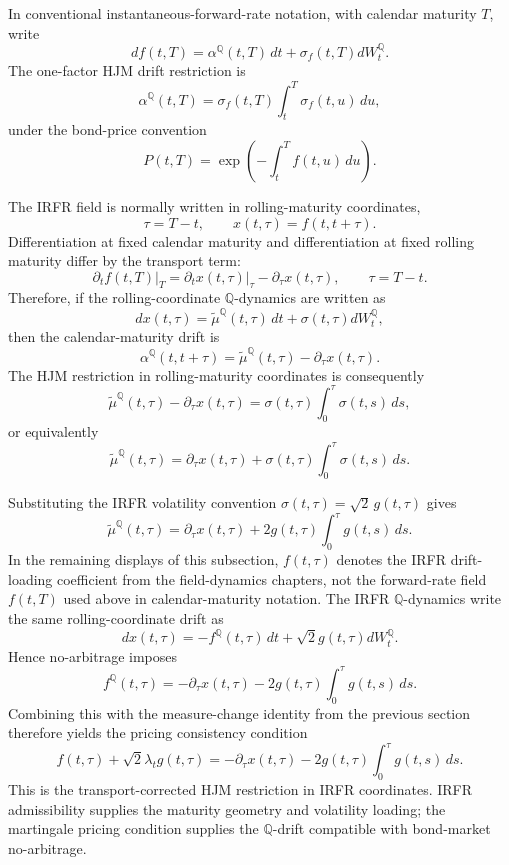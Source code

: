 \documentclass[11pt,oneside]{book}
\begin{document}
In conventional instantaneous-forward-rate notation, with calendar
maturity \(T\), write
\[
df(t,T)=\alpha^{\mathbb Q}(t,T)\,dt+
\sigma_f(t,T)dW_t^{\mathbb Q}.
\]
The one-factor HJM drift restriction is
\[
\alpha^{\mathbb Q}(t,T)
=
\sigma_f(t,T)
\int_t^T \sigma_f(t,u)\,du,
\]
under the bond-price convention
\[
P(t,T)=\exp\left(-\int_t^T f(t,u)\,du\right).
\]

The IRFR field is normally written in rolling-maturity coordinates,
\[
\tau=T-t,
\qquad
x(t,\tau)=f(t,t+\tau).
\]
Differentiation at fixed calendar maturity and differentiation at fixed
rolling maturity differ by the transport term:
\[
\left.\partial_t f(t,T)\right|_T
=
\left.\partial_t x(t,\tau)\right|_\tau
-
\partial_\tau x(t,\tau),
\qquad \tau=T-t.
\]
Therefore, if the rolling-coordinate \(\mathbb Q\)-dynamics are written as
\[
dx(t,\tau)
=
\widetilde\mu^{\mathbb Q}(t,\tau)\,dt
+
\sigma(t,\tau)dW_t^{\mathbb Q},
\]
then the calendar-maturity drift is
\[
\alpha^{\mathbb Q}(t,t+\tau)
=
\widetilde\mu^{\mathbb Q}(t,\tau)-\partial_\tau x(t,\tau).
\]
The HJM restriction in rolling-maturity coordinates is consequently
\[
\widetilde\mu^{\mathbb Q}(t,\tau)-\partial_\tau x(t,\tau)
=
\sigma(t,\tau)\int_0^\tau \sigma(t,s)\,ds,
\]
or equivalently
\[
\boxed{
\widetilde\mu^{\mathbb Q}(t,\tau)
=
\partial_\tau x(t,\tau)
+
\sigma(t,\tau)\int_0^\tau \sigma(t,s)\,ds.
}
\]

Substituting the IRFR volatility convention \(\sigma(t,\tau)=\sqrt{2}\,g(t,\tau)\)
gives
\[
\widetilde\mu^{\mathbb Q}(t,\tau)
=
\partial_\tau x(t,\tau)
+
2g(t,\tau)\int_0^\tau g(t,s)\,ds.
\]
In the remaining displays of this subsection, \(f(t,\tau)\) denotes the IRFR drift-loading coefficient from the field-dynamics chapters, not the forward-rate field \(f(t,T)\) used above in calendar-maturity notation. The IRFR \(\mathbb Q\)-dynamics write the same rolling-coordinate drift as
\[
dx(t,\tau)
=
-f^{\mathbb Q}(t,\tau)\,dt
+
\sqrt{2}g(t,\tau)dW_t^{\mathbb Q}.
\]
Hence no-arbitrage imposes
\[
\boxed{
f^{\mathbb Q}(t,\tau)
=
-\partial_\tau x(t,\tau)
-
2g(t,\tau)\int_0^\tau g(t,s)\,ds.
}
\]
Combining this with the measure-change identity from the previous section
therefore yields the pricing consistency condition
\[
\boxed{
f(t,\tau)+\sqrt{2}\lambda_t g(t,\tau)
=
-\partial_\tau x(t,\tau)
-
2g(t,\tau)\int_0^\tau g(t,s)\,ds.
}
\]
This is the transport-corrected HJM restriction in IRFR coordinates. IRFR
admissibility supplies the maturity geometry and volatility loading; the
martingale pricing condition supplies the \(\mathbb Q\)-drift compatible
with bond-market no-arbitrage.
\end{document}
